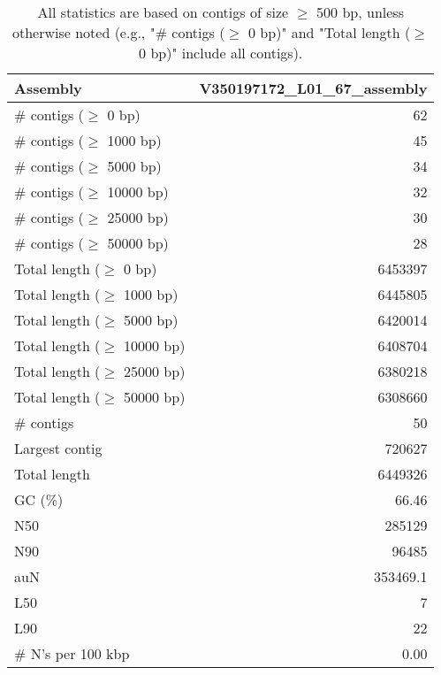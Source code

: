 \documentclass[12pt,a4paper]{article}
\begin{document}
\begin{table}[ht]
\begin{center}
\caption{All statistics are based on contigs of size $\geq$ 500 bp, unless otherwise noted (e.g., "\# contigs ($\geq$ 0 bp)" and "Total length ($\geq$ 0 bp)" include all contigs).}
\begin{tabular}{|l*{1}{|r}|}
\hline
Assembly & V350197172\_L01\_67\_assembly \\ \hline
\# contigs ($\geq$ 0 bp) & 62 \\ \hline
\# contigs ($\geq$ 1000 bp) & 45 \\ \hline
\# contigs ($\geq$ 5000 bp) & 34 \\ \hline
\# contigs ($\geq$ 10000 bp) & 32 \\ \hline
\# contigs ($\geq$ 25000 bp) & 30 \\ \hline
\# contigs ($\geq$ 50000 bp) & 28 \\ \hline
Total length ($\geq$ 0 bp) & 6453397 \\ \hline
Total length ($\geq$ 1000 bp) & 6445805 \\ \hline
Total length ($\geq$ 5000 bp) & 6420014 \\ \hline
Total length ($\geq$ 10000 bp) & 6408704 \\ \hline
Total length ($\geq$ 25000 bp) & 6380218 \\ \hline
Total length ($\geq$ 50000 bp) & 6308660 \\ \hline
\# contigs & 50 \\ \hline
Largest contig & 720627 \\ \hline
Total length & 6449326 \\ \hline
GC (\%) & 66.46 \\ \hline
N50 & 285129 \\ \hline
N90 & 96485 \\ \hline
auN & 353469.1 \\ \hline
L50 & 7 \\ \hline
L90 & 22 \\ \hline
\# N's per 100 kbp & 0.00 \\ \hline
\end{tabular}
\end{center}
\end{table}
\end{document}
